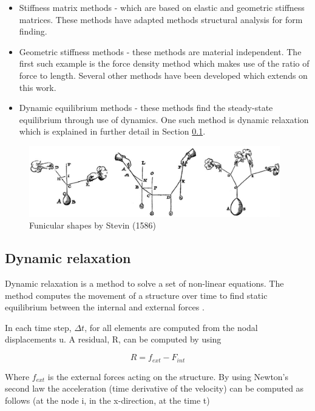\begin{itemize} 
\item Stiffness matrix methods - which are based on elastic and geometric stiffness matrices. These methods have adapted methods structural analysis for form finding.
\item Geometric stiffness methods - these methods are material independent. The first such example is the force density method \cite{Schek1974} which makes use of the ratio of force to length. Several other methods have been developed which extends on this work.
\item Dynamic equilibrium methods - these methods find the steady-state equilibrium through use of dynamics. One such method is dynamic relaxation \cite{Day1965} which is explained in further detail in Section \ref{sec:dr}.
\end{itemize} 

\begin{figure}
  \includegraphics[width=310pt]{graphics/stevin.png}
  \caption{Funicular shapes by Stevin (1586)}
  \label{fig:Stevin}
\end{figure}

\subsection{Dynamic relaxation}
\label{sec:dr}
Dynamic relaxation is a method to solve a set of non-linear equations. The method computes the movement of a structure over time to find static equilibrium between the internal and external forces \cite{Day1965}\cite{barnes1988form}. 

In each time step,  $\Delta t$, for all elements are computed from the nodal displacements u. A residual, R, can be computed by using 

\begin{equation*}
  R = f_{ext} - F_{int} 
\end{equation*}

Where $f_{ext}$ is the external forces acting on the structure. By using Newton’s second law the acceleration (time derivative of the velocity) can be computed as follows (at the node i, in the x-direction, at the time t)

